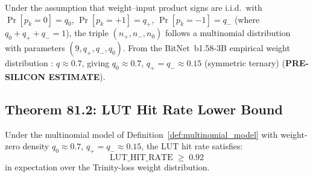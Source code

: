 \begin{definition}
\label{def:multinomial_model}
Under the assumption that weight--input product signs are i.i.d.\ with
$\Pr[p_k = 0] = q_0$, $\Pr[p_k = +1] = q_{+}$, $\Pr[p_k = -1] = q_{-}$
(where $q_0 + q_{+} + q_{-} = 1$), the triple $(n_{+}, n_{-}, n_0)$ follows
a multinomial distribution with parameters $(9, q_{+}, q_{-}, q_0)$.
From the BitNet~b1.58-3B empirical weight distribution
\cite{bitnet_b158_2024}: $q \approx 0.7$, giving $q_0 \approx 0.7$,
$q_{+} = q_{-} \approx 0.15$ (symmetric ternary) (\textbf{PRE-SILICON ESTIMATE}).
\end{definition}

\subsection{Theorem 81.2: LUT Hit Rate Lower Bound}

\begin{theorem}
\label{thm:lut_hit_rate_bound}
Under the multinomial model of Definition~\ref{def:multinomial_model} with
weight-zero density $q_0 \approx 0.7$, $q_{+} = q_{-} \approx 0.15$,
the LUT hit rate satisfies:
\[
  \mathrm{LUT\_HIT\_RATE} \;\geq\; 0.92
\]
in expectation over the Trinity-loss weight distribution.
\end{theorem}

